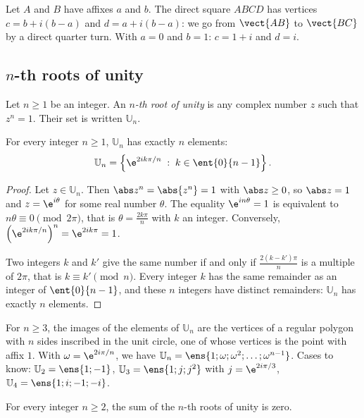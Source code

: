\begin{example}
Let $A$ and $B$ have affixes $a$ and $b$. The direct square $ABCD$ has vertices $c=b+i(b-a)$ and $d=a+i(b-a)$: we go from $\vect{AB}$ to $\vect{BC}$ by a direct quarter turn. With $a=0$ and $b=1$: $c=1+i$ and $d=i$.
\end{example}

\subsection{$n$-th roots of unity}
\begin{definition}
Let $n\ge1$ be an integer. An \emph{$n$-th root of unity} is any complex number $z$ such that $z^n=1$. Their set is written $\mathbb U_n$.
\end{definition}
\begin{theorem}
For every integer $n\ge1$, $\mathbb U_n$ has exactly $n$ elements:
\[\mathbb U_n=\left\{\e^{2ik\pi/n}\;:\;k\in\ent{0}{n-1}\right\}.\]
\end{theorem}
\begin{proof}
Let $z\in\mathbb U_n$. Then $\abs z^n=\abs{z^n}=1$ with $\abs z\ge0$, so $\abs z=1$ and $z=\e^{i\theta}$ for some real number $\theta$. The equality $\e^{in\theta}=1$ is equivalent to $n\theta\equiv0\pmod{2\pi}$, that is $\theta=\frac{2k\pi}n$ with $k$ an integer. Conversely, $\left(\e^{2ik\pi/n}\right)^n=\e^{2ik\pi}=1$.\par
Two integers $k$ and $k'$ give the same number if and only if $\frac{2(k-k')\pi}{n}$ is a multiple of $2\pi$, that is $k\equiv k'\pmod n$. Every integer $k$ has the same remainder as an integer of $\ent{0}{n-1}$, and these $n$ integers have distinct remainders: $\mathbb U_n$ has exactly $n$ elements.
\end{proof}
\begin{keypoint}
For $n\ge3$, the images of the elements of $\mathbb U_n$ are the vertices of a regular polygon with $n$ sides inscribed in the unit circle, one of whose vertices is the point with affix $1$. With $\omega=\e^{2i\pi/n}$, we have $\mathbb U_n=\ens{1;\omega;\omega^2;\dots;\omega^{n-1}}$. Cases to know: $\mathbb U_2=\ens{1;-1}$, $\mathbb U_3=\ens{1;j;j^2}$ with $j=\e^{2i\pi/3}$, $\mathbb U_4=\ens{1;i;-1;-i}$.
\end{keypoint}
\begin{theorem}
For every integer $n\ge2$, the sum of the $n$-th roots of unity is zero.
\end{theorem}
